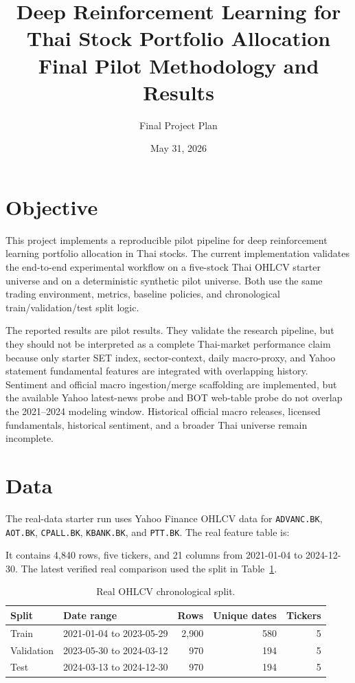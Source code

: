 \documentclass[11pt]{article}
\title{Deep Reinforcement Learning for Thai Stock Portfolio Allocation\\Final Pilot Methodology and Results}
\author{Final Project Plan}
\date{May 31, 2026}
\begin{document}
\maketitle

\section{Objective}
This project implements a reproducible pilot pipeline for deep reinforcement learning portfolio allocation in Thai stocks. The current implementation validates the end-to-end experimental workflow on a five-stock Thai OHLCV starter universe and on a deterministic synthetic pilot universe. Both use the same trading environment, metrics, baseline policies, and chronological train/validation/test split logic.

The reported results are pilot results. They validate the research pipeline, but they should not be interpreted as a complete Thai-market performance claim because only starter SET index, sector-context, daily macro-proxy, and Yahoo statement fundamental features are integrated with overlapping history. Sentiment and official macro ingestion/merge scaffolding are implemented, but the available Yahoo latest-news probe and BOT web-table probe do not overlap the 2021--2024 modeling window. Historical official macro releases, licensed fundamentals, historical sentiment, and a broader Thai universe remain incomplete.

\section{Data}
The real-data starter run uses Yahoo Finance OHLCV data for \texttt{ADVANC.BK}, \texttt{AOT.BK}, \texttt{CPALL.BK}, \texttt{KBANK.BK}, and \texttt{PTT.BK}. The real feature table is:

\begin{quote}
\end{quote}

It contains 4,840 rows, five tickers, and 21 columns from 2021-01-04 to 2024-12-30. The latest verified real comparison used the split in Table~\ref{tab:real-split}.

\begin{table}[h]
\centering
\caption{Real OHLCV chronological split.}
\label{tab:real-split}
\begin{tabular}{llrrr}
\toprule
Split & Date range & Rows & Unique dates & Tickers \\
\midrule
Train & 2021-01-04 to 2023-05-29 & 2,900 & 580 & 5 \\
Validation & 2023-05-30 to 2024-03-12 & 970 & 194 & 5 \\
Test & 2024-03-13 to 2024-12-30 & 970 & 194 & 5 \\
\bottomrule
\end{tabular}
\end{table}
\end{document}
